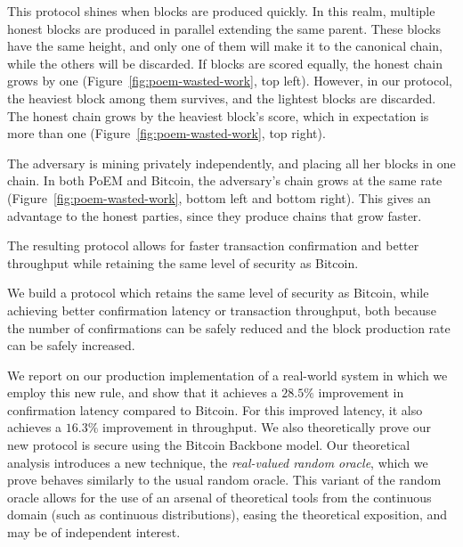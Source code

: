 This protocol shines when blocks are produced quickly. In this realm, multiple honest blocks
are produced in parallel extending the same parent.
These blocks have the same height, and only one of them will
make it to the canonical chain, while the others will be discarded.
If blocks are scored equally, the honest chain grows by one (Figure~\ref{fig:poem-wasted-work}, top left).
However, in our protocol, the heaviest block among them survives,
and the lightest blocks are discarded. The honest chain grows by the heaviest
block's score, which in expectation is more than one (Figure~\ref{fig:poem-wasted-work}, top right).

The adversary is mining privately independently, and placing all her blocks in one chain.
In both PoEM and Bitcoin, the adversary's chain grows at the same rate (Figure~\ref{fig:poem-wasted-work},
bottom left and bottom right).
This gives an advantage to the honest
parties, since they produce chains that grow faster.

The resulting protocol allows for faster transaction confirmation and better throughput while
retaining the same level of security as Bitcoin.

\noindent
{}
We build a protocol which retains the same level of security as Bitcoin, while achieving
better confirmation latency or transaction throughput, both because the number of confirmations
can be safely reduced and the block production rate can be safely increased.

We report on our production implementation of a real-world system
in which we employ this new rule, and show that it achieves a $28.5\%$
improvement in confirmation latency compared to Bitcoin. For this improved
latency, it also achieves a $16.3\%$ improvement in throughput.
We also theoretically prove our new protocol is secure
using the Bitcoin Backbone model. Our theoretical analysis introduces
a new technique, the \emph{real-valued random oracle}, which we prove behaves
similarly to the usual random oracle. This variant of the
random oracle allows for the use of an arsenal of theoretical tools from the
continuous domain (such as continuous distributions), easing the theoretical
exposition, and may be of independent interest.

